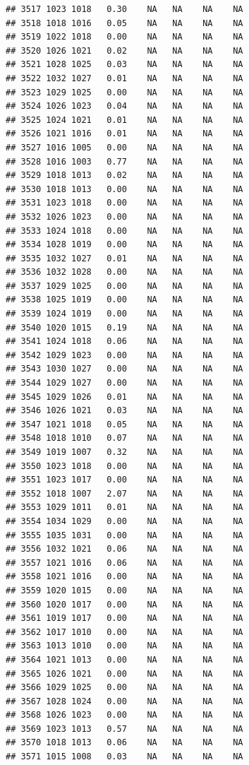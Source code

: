 \documentclass{article}\usepackage{graphicx, color}
\makeatletter
\newenvironment{kframe}{%
 \def\at@end@of@kframe{}%
 \ifinner\ifhmode%
  \def\at@end@of@kframe{\end{minipage}}%
  \begin{minipage}{\columnwidth}%
 \fi\fi%
 \def\FrameCommand##1{\hskip\@totalleftmargin \hskip-\fboxsep
 \colorbox{shadecolor}{##1}\hskip-\fboxsep
     \hskip-\linewidth \hskip-\@totalleftmargin \hskip\columnwidth}%
 \MakeFramed {\advance\hsize-\width
   \@totalleftmargin\z@ \linewidth\hsize
   \@setminipage}}%
 {\par\unskip\endMakeFramed%
 \at@end@of@kframe}
\newenvironment{knitrout}{}{} %
\makeatother
\begin{document}
\begin{knitrout}
\begin{kframe}
\begin{verbatim}
## 3517 1023 1018   0.30    NA   NA    NA    NA
## 3518 1018 1016   0.05    NA   NA    NA    NA
## 3519 1022 1018   0.00    NA   NA    NA    NA
## 3520 1026 1021   0.02    NA   NA    NA    NA
## 3521 1028 1025   0.03    NA   NA    NA    NA
## 3522 1032 1027   0.01    NA   NA    NA    NA
## 3523 1029 1025   0.00    NA   NA    NA    NA
## 3524 1026 1023   0.04    NA   NA    NA    NA
## 3525 1024 1021   0.01    NA   NA    NA    NA
## 3526 1021 1016   0.01    NA   NA    NA    NA
## 3527 1016 1005   0.00    NA   NA    NA    NA
## 3528 1016 1003   0.77    NA   NA    NA    NA
## 3529 1018 1013   0.02    NA   NA    NA    NA
## 3530 1018 1013   0.00    NA   NA    NA    NA
## 3531 1023 1018   0.00    NA   NA    NA    NA
## 3532 1026 1023   0.00    NA   NA    NA    NA
## 3533 1024 1018   0.00    NA   NA    NA    NA
## 3534 1028 1019   0.00    NA   NA    NA    NA
## 3535 1032 1027   0.01    NA   NA    NA    NA
## 3536 1032 1028   0.00    NA   NA    NA    NA
## 3537 1029 1025   0.00    NA   NA    NA    NA
## 3538 1025 1019   0.00    NA   NA    NA    NA
## 3539 1024 1019   0.00    NA   NA    NA    NA
## 3540 1020 1015   0.19    NA   NA    NA    NA
## 3541 1024 1018   0.06    NA   NA    NA    NA
## 3542 1029 1023   0.00    NA   NA    NA    NA
## 3543 1030 1027   0.00    NA   NA    NA    NA
## 3544 1029 1027   0.00    NA   NA    NA    NA
## 3545 1029 1026   0.01    NA   NA    NA    NA
## 3546 1026 1021   0.03    NA   NA    NA    NA
## 3547 1021 1018   0.05    NA   NA    NA    NA
## 3548 1018 1010   0.07    NA   NA    NA    NA
## 3549 1019 1007   0.32    NA   NA    NA    NA
## 3550 1023 1018   0.00    NA   NA    NA    NA
## 3551 1023 1017   0.00    NA   NA    NA    NA
## 3552 1018 1007   2.07    NA   NA    NA    NA
## 3553 1029 1011   0.01    NA   NA    NA    NA
## 3554 1034 1029   0.00    NA   NA    NA    NA
## 3555 1035 1031   0.00    NA   NA    NA    NA
## 3556 1032 1021   0.06    NA   NA    NA    NA
## 3557 1021 1016   0.06    NA   NA    NA    NA
## 3558 1021 1016   0.00    NA   NA    NA    NA
## 3559 1020 1015   0.00    NA   NA    NA    NA
## 3560 1020 1017   0.00    NA   NA    NA    NA
## 3561 1019 1017   0.00    NA   NA    NA    NA
## 3562 1017 1010   0.00    NA   NA    NA    NA
## 3563 1013 1010   0.00    NA   NA    NA    NA
## 3564 1021 1013   0.00    NA   NA    NA    NA
## 3565 1026 1021   0.00    NA   NA    NA    NA
## 3566 1029 1025   0.00    NA   NA    NA    NA
## 3567 1028 1024   0.00    NA   NA    NA    NA
## 3568 1026 1023   0.00    NA   NA    NA    NA
## 3569 1023 1013   0.57    NA   NA    NA    NA
## 3570 1018 1013   0.06    NA   NA    NA    NA
## 3571 1015 1008   0.03    NA   NA    NA    NA

\end{verbatim}
\end{kframe}
\end{knitrout}
\end{document}
